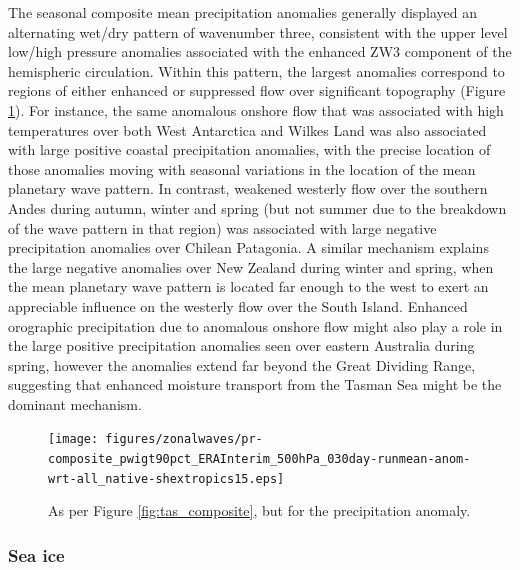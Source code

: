 The seasonal composite mean precipitation anomalies generally displayed an alternating wet/dry pattern of wavenumber three, consistent with the upper level low/high pressure anomalies associated with the enhanced ZW3 component of the hemispheric circulation. Within this pattern, the largest anomalies correspond to regions of either enhanced or suppressed flow over significant topography (Figure \ref{fig:pr_composite}). For instance, the same anomalous onshore flow that was associated with high temperatures over both West Antarctica and Wilkes Land was also associated with large positive coastal precipitation anomalies, with the precise location of those anomalies moving with seasonal variations in the location of the mean planetary wave pattern. In contrast, weakened westerly flow over the southern Andes during autumn, winter and spring (but not summer due to the breakdown of the wave pattern in that region) was associated with large negative precipitation anomalies over Chilean Patagonia. A similar mechanism explains the large negative anomalies over New Zealand during winter and spring, when the mean planetary wave pattern is located far enough to the west to exert an appreciable influence on the westerly flow over the South Island. Enhanced orographic precipitation due to anomalous onshore flow might also play a role in the large positive precipitation anomalies seen over eastern Australia during spring, however the anomalies extend far beyond the Great Dividing Range, suggesting that enhanced moisture transport from the Tasman Sea might be the dominant mechanism. 

\begin{figure}
\begin{center}
\texttt{[image: figures/zonalwaves/pr-composite\_pwigt90pct\_ERAInterim\_500hPa\_030day-runmean-anom-wrt-all\_native-shextropics15.eps]}
\caption{\label{fig:pr_composite}
As per Figure \ref{fig:tas_composite}, but for the precipitation anomaly.}
\end{center}
\end{figure}


\subsubsection{Sea ice}

